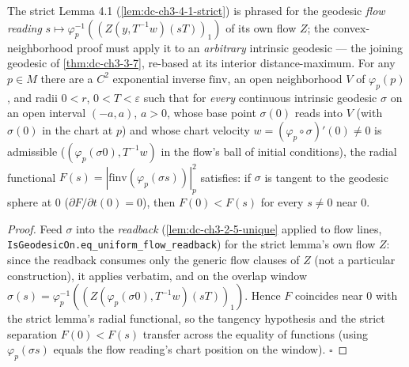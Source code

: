 \begin{lemma}
  \label{lem:dc-ch3-4-2-rebase}
  \leanok
  The strict Lemma 4.1 (\cref{lem:dc-ch3-4-1-strict}) is phrased for the geodesic
  \emph{flow reading} $s\mapsto\varphi_p^{-1}((Z(y,T^{-1}w)(sT))_1)$ of its own flow $Z$;
  the convex-neighborhood proof must apply it to an \emph{arbitrary} intrinsic geodesic — the
  joining geodesic of \cref{thm:dc-ch3-3-7}, re-based at its interior distance-maximum. For any
  $p\in M$ there are a $C^2$ exponential inverse $\mathrm{finv}$, an open neighborhood $V$ of
  $\varphi_p(p)$, and radii $0<r$, $0<T<\varepsilon$ such that for \emph{every} continuous
  intrinsic geodesic $\sigma$ on an open interval $(-a,a)$, $a>0$, whose base point $\sigma(0)$
  reads into $V$ (with $\sigma(0)$ in the chart at $p$) and whose chart velocity
  $w=(\varphi_p\circ\sigma)'(0)\neq0$ is admissible ($(\varphi_p(\sigma 0),T^{-1}w)$ in the flow's
  ball of initial conditions), the radial functional $F(s)=|\mathrm{finv}(\varphi_p(\sigma s))|_p^2$
  satisfies: if $\sigma$ is tangent to the geodesic sphere at $0$ ($\partial F/\partial t(0)=0$),
  then $F(0)<F(s)$ for every $s\neq0$ near $0$.
\end{lemma}
\begin{proof}
  \leanok
  Feed $\sigma$ into the \emph{readback} (\cref{lem:dc-ch3-2-5-unique} applied to flow lines,
  \texttt{IsGeodesicOn.eq\_uniform\_flow\_readback}) for the strict lemma's own flow $Z$: since
  the readback consumes only the generic flow clauses of $Z$ (not a particular construction), it
  applies verbatim, and on the overlap window $\sigma(s)=\varphi_p^{-1}((Z(\varphi_p(\sigma 0),
  T^{-1}w)(sT))_1)$. Hence $F$ coincides near $0$ with the strict lemma's radial functional, so
  the tangency hypothesis and the strict separation $F(0)<F(s)$ transfer across the equality of
  functions (using $\varphi_p(\sigma s)$ equals the flow reading's chart position on the window).
  $\square$
\end{proof}

